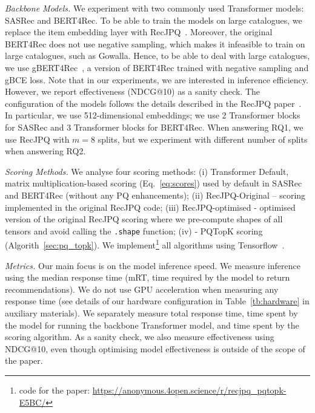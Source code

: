 \documentclass[sigconf,natbib=true, review=true]{acmart} %
\newcommand{\rsasha}[1]{\textcolor[HTML]{FF0000}{#1}}
\begin{document}
\textit{Backbone Models.} We experiment with two commonly used Transformer models: SASRec and BERT4Rec. To be able to train the models on large catalogues, we replace the item embedding layer with RecJPQ~\cite{petrovRecJPQTrainingLargeCatalogue2024}. Moreover, the original BERT4Rec does not use negative sampling, which makes it infeasible to train on large catalogues, such as Gowalla. Hence, to be able to deal with large catalogues, we use gBERT4Rec~\cite{petrovGSASRecReducingOverconfidence2023}, a version of BERT4Rec trained with negative sampling and gBCE loss. Note that in our experiments, we are interested in inference efficiency. However, we report effectiveness (NDCG@10) as a sanity check. The configuration of the models follows the details described in the RecJPQ paper~\cite{petrovRecJPQTrainingLargeCatalogue2024}. In particular, we use 512-dimensional embeddings;  we use 2 Transformer blocks for SASRec and 3 Transformer blocks for BERT4Rec. When answering RQ1, we use RecJPQ with $m=8$ splits, but we experiment with different number of splits when answering RQ2. 

\textit{Scoring Methods.} We analyse four scoring methods: (i) Transformer Default,  matrix multiplication-based scoring (Eq.~\eqref{eq:scores}) used by default in SASRec and BERT4Rec \rsasha{(without any PQ enhancements)}; (ii) RecJPQ-Original -- scoring implemented in the original RecJPQ code; (iii) RecJPQ-optimised - optimised version of the original RecJPQ scoring where \rsasha{we pre-compute shapes of all tensors and avoid calling the \texttt{.shape} function}; (iv) - PQTopK scoring (Algorith~\ref{sec:pq_topk}). We implement\footnote{\rsasha{code for the paper: \href{https://anonymous.4open.science/r/recjpq\_pqtopk-E5BC/}{https://anonymous.4open.science/r/recjpq\_pqtopk-E5BC/}}} all algorithms using Tensorflow~\cite{abadiTensorFlowSystemLargeScale2016}. 

\textit{Metrics.} Our main focus is on the model inference speed. We measure inference using the median response time (mRT, time required by the model to return recommendations). We do not use GPU acceleration when measuring any response time \rsasha{(see details of our hardware configuration in Table~\ref{tb:hardware} in auxiliary materials)}.  We separately measure total response time, time spent by the model for running the backbone Transformer model, and time spent by the scoring algorithm. As a sanity check, we also measure effectiveness using NDCG@10, even though optimising model effectiveness is outside of the scope of the paper. 
\end{document}
